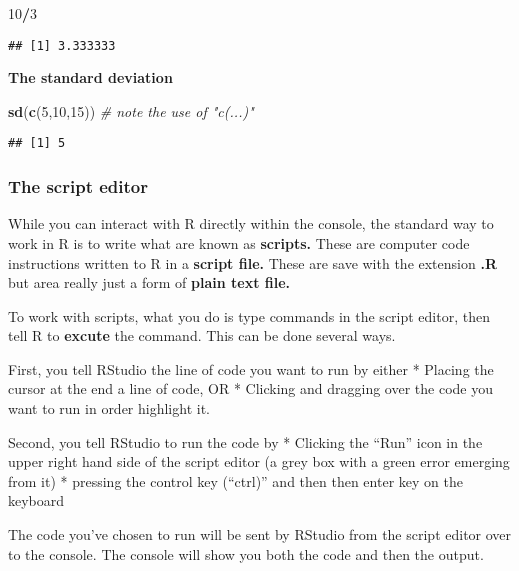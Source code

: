 \documentclass[]{book}
\newenvironment{Shaded}{\begin{snugshade}}{\end{snugshade}}
\newcommand{\KeywordTok}[1]{\textcolor[rgb]{0.13,0.29,0.53}{\textbf{#1}}}
\newcommand{\DecValTok}[1]{\textcolor[rgb]{0.00,0.00,0.81}{#1}}
\newcommand{\CommentTok}[1]{\textcolor[rgb]{0.56,0.35,0.01}{\textit{#1}}}
\newcommand{\OperatorTok}[1]{\textcolor[rgb]{0.81,0.36,0.00}{\textbf{#1}}}
\newcommand{\NormalTok}[1]{#1}
\theoremstyle{definition}
\theoremstyle{definition}
\theoremstyle{definition}
\theoremstyle{remark}
\begin{document}
\begin{Shaded}
\begin{Highlighting}[]
\DecValTok{10}\OperatorTok{/}\DecValTok{3}
\end{Highlighting}
\end{Shaded}

\begin{verbatim}
## [1] 3.333333
\end{verbatim}

\textbf{The standard deviation}

\begin{Shaded}
\begin{Highlighting}[]
\KeywordTok{sd}\NormalTok{(}\KeywordTok{c}\NormalTok{(}\DecValTok{5}\NormalTok{,}\DecValTok{10}\NormalTok{,}\DecValTok{15}\NormalTok{)) }\CommentTok{# note the use of "c(...)"}
\end{Highlighting}
\end{Shaded}

\begin{verbatim}
## [1] 5
\end{verbatim}

\subsubsection{The script editor}\label{the-script-editor}

While you can interact with R directly within the console, the standard
way to work in R is to write what are known as \textbf{scripts.} These
are computer code instructions written to R in a \textbf{script file.}
These are save with the extension \textbf{.R} but area really just a
form of \textbf{plain text file.}

To work with scripts, what you do is type commands in the script editor,
then tell R to \textbf{excute} the command. This can be done several
ways.

First, you tell RStudio the line of code you want to run by either *
Placing the cursor at the end a line of code, OR * Clicking and dragging
over the code you want to run in order highlight it.

Second, you tell RStudio to run the code by * Clicking the ``Run'' icon
in the upper right hand side of the script editor (a grey box with a
green error emerging from it) * pressing the control key (``ctrl)'' and
then then enter key on the keyboard

The code you've chosen to run will be sent by RStudio from the script
editor over to the console. The console will show you both the code and
then the output.
\end{document}
